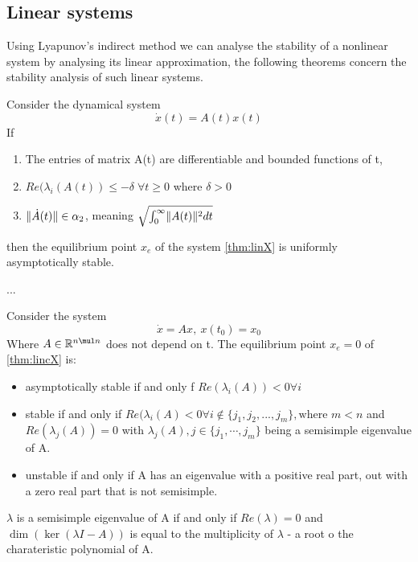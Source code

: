 \subsection{Linear systems}
Using Lyapunov's indirect method we can analyse the stability of a nonlinear system by analysing its linear approximation, the following theorems concern the stability analysis of such linear systems.
\thm{}
{
    Consider the dynamical system
             \begin{equation}
                \label{thm:linX}
                \dot{x}(t) = A(t)x(t)
            \end{equation}
     If 
     \begin{enumerate}
         \item The entries of matrix A(t) are differentiable and bounded functions of t,
        \item $Re(\lambda_i(A(t)) \le -\delta \; \forall t\ge 0$ where $\delta > 0$
        \item $\lVert\dot{A}(t)\rVert \in \alpha_2$, meaning $\sqrt{\int_0^\infty \lVert A(t)\rVert^2 dt}$
     \end{enumerate}
    then the equilibrium point $x_e$ of the system  \ref{thm:linX} is uniformly asymptotically stable.

    \ex{}
    {...}
}
\thm{}
{
 Consider the system
 \begin{equation}
     \label{thm:lincX}
     \dot{x} = Ax, \: x(t_0) = x_0
 \end{equation}
 Where $A \in \mathbb{R}^{n\mul n}$ does not depend on t. The equilibrium point $x_e = 0$ of \ref{thm:lincX} is:
 \begin{itemize}
         \item asymptotically stable if and only f $Re(\lambda_i(A)) < 0 \forall i $ 
         \item stable if and only if $Re(\lambda_i(A) < 0 \forall i \not \in \{j_1, j_2, ..., j_m\}, \text{where } m < n $ and $Re(\lambda_j(A)) = 0$ with  $\lambda_j(A), j \in \{ j_1, \cdots ,j_m\}$ being a semisimple eigenvalue of A.
         \item unstable if and only if A has an eigenvalue with a positive real part, out with a zero real part that is not semisimple.
         
 \end{itemize}
 {
     $\lambda$ is a semisimple eigenvalue of A if and only if  $Re(\lambda) = 0$ and  $\dim (\ker (\lambda I - A))$ is equal to the multiplicity of  $\lambda$ - a root o the charateristic polynomial of A.
 }

 \ex{}
 {}
}


